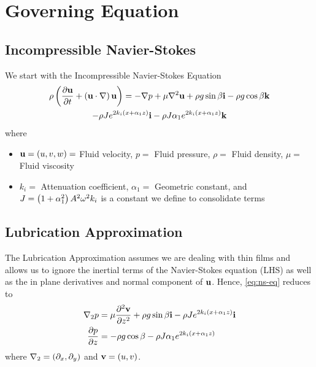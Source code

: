 \section{Governing Equation}
\subsection{Incompressible Navier-Stokes}
\begin{frame}
    We start with the Incompressible Navier-Stokes Equation
    \begin{multline}
        \rho \left( \frac{\partial \textbf{u}}{\partial t} + \left( \textbf{u} \cdot \nabla \right)\textbf{u} \right) = -\nabla p
        + \mu \nabla^2 \textbf{u} + \rho g \sin \beta \textbf{i} - \rho g \cos \beta \textbf{k} \\
        - \rho J e^{2k_i \left( x + \alpha_1 z \right)} \textbf{i} - \rho J \alpha_1 e^{2k_i \left( x + \alpha_1 z \right)} \textbf{k}
        \label{eq:ns-eq}
    \end{multline}
    where 
    \begin{itemize} 
        \item $\textbf{u} = \left( u,v,w \right) =$ Fluid velocity, $p =$ Fluid pressure, $\rho =$ Fluid density, $\mu =$ Fluid viscosity
        \item $k_i =$  Attenuation coefficient, $\alpha_1 =$ Geometric constant, and $J = \left( 1 + \alpha_1^2 \right)A^2\omega^2 k_i$
        is a constant we define to consolidate terms
    \end{itemize}

\end{frame}
\subsection{Lubrication Approximation}
\begin{frame}
    The Lubrication Approximation assumes we are dealing with thin films
    and allows us to ignore the inertial terms of the Navier-Stokes equation (LHS) as well as the in plane
    derivatives and normal component of $\textbf{u}$. Hence, \cref{eq:ns-eq} reduces to 
    \begin{equation}
        \begin{aligned}
            \nabla_2 p &= \mu \frac{\partial^2 \textbf{v}}{\partial z^2} + \rho g \sin\beta \textbf{i} - \rho Je^{2k_i \left( x + \alpha_1 z \right)}\textbf{i}\\
            \frac{\partial p}{\partial z} &= -\rho g \cos\beta - \rho J\alpha_1 e^{2k_i \left( x + \alpha_1 z \right)}
        \end{aligned}
        \label{eq:lub_approx}
    \end{equation}
    where $\nabla_2 = \left( \partial_x, \partial_y \right)$ and $\textbf{v} = \left( u, v \right)$. 
\end{frame}
